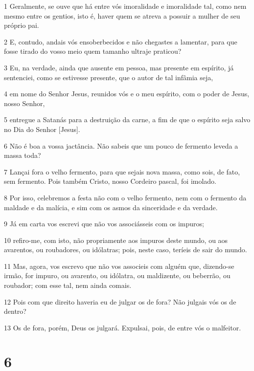 \par 1 Geralmente, se ouve que há entre vós imoralidade e imoralidade tal, como nem mesmo entre os gentios, isto é, haver quem se atreva a possuir a mulher de seu próprio pai.
\par 2 E, contudo, andais vós ensoberbecidos e não chegastes a lamentar, para que fosse tirado do vosso meio quem tamanho ultraje praticou?
\par 3 Eu, na verdade, ainda que ausente em pessoa, mas presente em espírito, já sentenciei, como se estivesse presente, que o autor de tal infâmia seja,
\par 4 em nome do Senhor Jesus, reunidos vós e o meu espírito, com o poder de Jesus, nosso Senhor,
\par 5 entregue a Satanás para a destruição da carne, a fim de que o espírito seja salvo no Dia do Senhor [Jesus].
\par 6 Não é boa a vossa jactância. Não sabeis que um pouco de fermento leveda a massa toda?
\par 7 Lançai fora o velho fermento, para que sejais nova massa, como sois, de fato, sem fermento. Pois também Cristo, nosso Cordeiro pascal, foi imolado.
\par 8 Por isso, celebremos a festa não com o velho fermento, nem com o fermento da maldade e da malícia, e sim com os asmos da sinceridade e da verdade.
\par 9 Já em carta vos escrevi que não vos associásseis com os impuros;
\par 10 refiro-me, com isto, não propriamente aos impuros deste mundo, ou aos avarentos, ou roubadores, ou idólatras; pois, neste caso, teríeis de sair do mundo.
\par 11 Mas, agora, vos escrevo que não vos associeis com alguém que, dizendo-se irmão, for impuro, ou avarento, ou idólatra, ou maldizente, ou beberrão, ou roubador; com esse tal, nem ainda comais.
\par 12 Pois com que direito haveria eu de julgar os de fora? Não julgais vós os de dentro?
\par 13 Os de fora, porém, Deus os julgará. Expulsai, pois, de entre vós o malfeitor.

\chapter{6}

